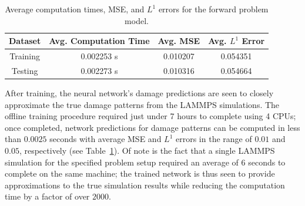 \begin{table}
  \centering
  \begin{tabular}{c|c|c|c}
    Dataset  &  Avg. Computation Time  & Avg. MSE &  Avg. $L^1$ Error \\ \hline
    Training &    0.002253 s &    0.010207  &   0.054351  \\ 
    Testing  &    0.002273 s &    0.010316  &   0.054664  
  \end{tabular}
  \caption{Average computation times, MSE, and $L^1$ errors for the forward problem model.}
  \label{fig:forward_results_table}
\end{table}


After training, the neural network's damage predictions are seen to closely approximate the true damage patterns from the LAMMPS simulations.  The offline training procedure required just under 7 hours to complete using 4 CPUs; once completed, network predictions for damage patterns can be computed in less than $0.0025$ seconds with average MSE and $L^1$ errors in the range of $0.01$ and $0.05$, respectively (see Table~\ref{fig:forward_results_table}).  Of note is the fact that a single LAMMPS simulation for the specified problem setup required an average of $6$ seconds to complete on the same machine;  the trained network is thus seen to  provide approximations to the true simulation results while reducing the computation time  by a factor of over $2000$.




